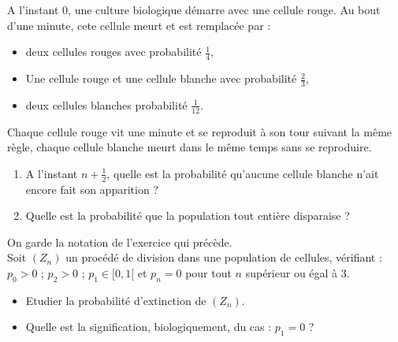 \begin{exer}
A l'instant $0$, une culture biologique d\'emarre avec une cellule rouge. %
Au bout d'une minute, cete cellule meurt et est remplacée par :
\begin{itemize}
\item deux cellules rouges avec probabilit\'e $\frac{1}{4}$,
\item Une cellule rouge et une cellule blanche avec probabilit\'e $\frac{2}{3}$,
\item deux cellules blanches probabilit\'e $\frac{1}{12}$.
\end{itemize}
Chaque cellule rouge vit une minute et se reproduit \`a son tour suivant la m\^eme r\`egle, %
chaque cellule blanche meurt dans le m\^eme temps sans se reproduire.
\begin{enumerate}
\item A l'instant $n+\frac{1}{2}$, quelle est la probabilit\'e qu'aucune cellule blanche %
n'ait encore fait son apparition ?
\item Quelle est la probabilit\'e que la population tout enti\`ere disparaise ?
\end{enumerate}
\end{exer}

\begin{exer}
On garde la notation de l'exercice qui précède.\\
Soit $(Z_n)$ un proc\'ed\'e de division dans une population de cellules, v\'erifiant : %
$p_0>0$ ; $p_2>0$ ; $p_1\in[0,1[$ et $p_n=0$ pour tout $n$ sup\'erieur ou \'egal \`a $3$.
\begin{itemize}
\item Etudier la probabilit\'e d'extinction de $(Z_n)$.
\item Quelle est la signification, biologiquement, du cas : $p_1=0$ ?
\end{itemize}
\end{exer}
